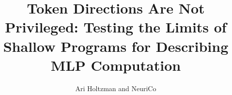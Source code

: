 \documentclass{article}
\title{Token Directions Are Not Privileged: Testing the Limits of Shallow Programs for Describing MLP Computation}
\author{Ari Holtzman and NeuriCo}
\begin{document}
\maketitle

\begin{abstract}

\end{abstract}










\end{document}
